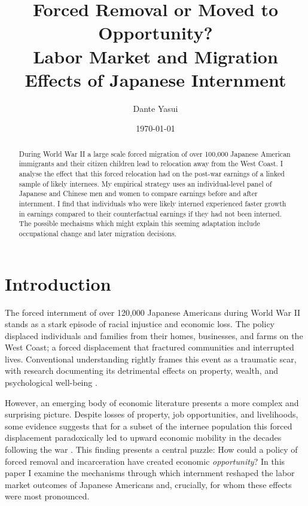\documentclass[12pt]{article}
\author{Dante Yasui}
\date{\today}
\title{Forced Removal or Moved to Opportunity?\\\medskip
\large Labor Market and Migration Effects of Japanese Internment}
\begin{document}
\maketitle
\begin{abstract}
During World War II a large scale forced migration of over 100,000
Japanese American immigrants and their citizen children
lead to relocation away from the West Coast.
I analyse the effect that this forced relocation had
on the post-war earnings of a linked sample of likely internees.
My empirical strategy uses an individual-level panel of Japanese
and Chinese men and women to compare earnings before and after internment.
I find that individuals who were likely interned experienced faster growth in
earnings compared to their counterfactual earnings if they had not been
interned.
The possible mechaisms which might explain this seeming adaptation
include occupational change and later migration decisions.
\end{abstract}
\section{Introduction}
\label{sec:org0655be0}

The forced internment of over 120,000 Japanese Americans during World War II
stands as a stark episode of racial injustice and economic loss.
The policy displaced individuals and families
from their homes, businesses, and farms on the West Coast;
a forced displacement that fractured communities and interrupted lives.
Conventional understanding rightly frames this event as a traumatic scar,
with research documenting its detrimental effects
on property, wealth, and psychological well-being
\citep{commissiononwartimerelocationPersonalJusticeDenied1983}.

However, an emerging body of economic literature
presents a more complex and surprising picture.
Despite losses of property, job opportunities, and livelihoods,
some evidence suggests that for a subset of the internee population
this forced displacement paradoxically led to upward economic mobility
in the decades following the war
\citep{arellano-boverDisplacementDiversityMobility2022,shoagCausalEffectPlace2016}.
This finding presents a central puzzle:
How could a policy of forced removal and incarceration
have created economic \emph{opportunity}?
In this paper I examine the mechanisms through which
internment reshaped the labor market outcomes of Japanese Americans
and, crucially, for whom these effects were most pronounced.
\end{document}
